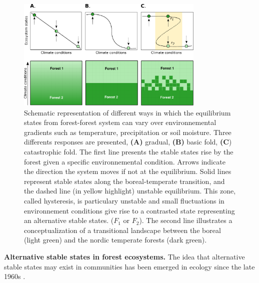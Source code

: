 \begin{figure}[t]
	\begin{center}
	\includegraphics[width=0.8\textwidth]{fig/states.pdf}
	\end{center}
	\caption{Schematic representation of different ways in which the equilibrium
	states from forest-forest system can vary over environnemental gradients such as temperature, precipitation
	or soil moisture. Three differents responses are presented,
	\textbf{(A)} gradual, \textbf{(B)} basic fold, \textbf{(C}) catastrophic fold.
	The first line presents the stable states rise by the forest
	given a specific environnemental condition. Arrows indicate the
	direction the system moves if not at the equilibrium. 
	Solid lines represent stable states along the boreal-temperate
	transition, and the dashed line (in yellow highlight) unstable equilibrium. This zone,
	called hysteresis, is particulary unstable and small fluctuations in
	environnement conditions give rise to a contrasted state representing an
	alternative stable states. ($F_1$ or $F_2$). 
	The second line illustrates a conceptualization of a transitional landscape
	between the boreal (light green) and the nordic temperate forests (dark
	green).}
	\label{fig1}
	\vspace{-1.25em}
\end{figure}



\textbf{Alternative stable states in forest ecosystems.} The idea that
alternative stable states may exist in communities has been emerged in ecology
since the late 1960s \cite{Scheffer2001,Society2014a}. 

